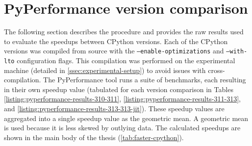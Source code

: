 \chapter{PyPerformance version comparison}
\label{chap:pyperformance-version-comparison}

The following section describes the procedure and provides the raw results used to evaluate the speedups between CPython versions.
Each of the CPython versions was compiled from source with the \texttt{--enable-optimizations} and \texttt{--with-lto} configuration flags. This compilation was performed on the experimental machine (detailed in \autoref{ssec:experimental-setup}) to avoid issues with cross-compilation.
The PyPerformance tool runs a suite of benchmarks, each resulting in their own speedup value (tabulated for each version comparison in Tables \ref{listing:pyperformance-results-310-311}, \ref{listing:pyperformance-results-311-313}, and \ref{listing:pyperformance-results-313-313-jit}). These speedup values are aggregated into a single speedup value as the geometric mean. %
A geometric mean is used because it is less skewed by outlying data. %
The calculated speedups are shown in the main body of the thesis (\autoref{tab:faster-cpython}).

\vspace{2em}


\vspace{2em}

